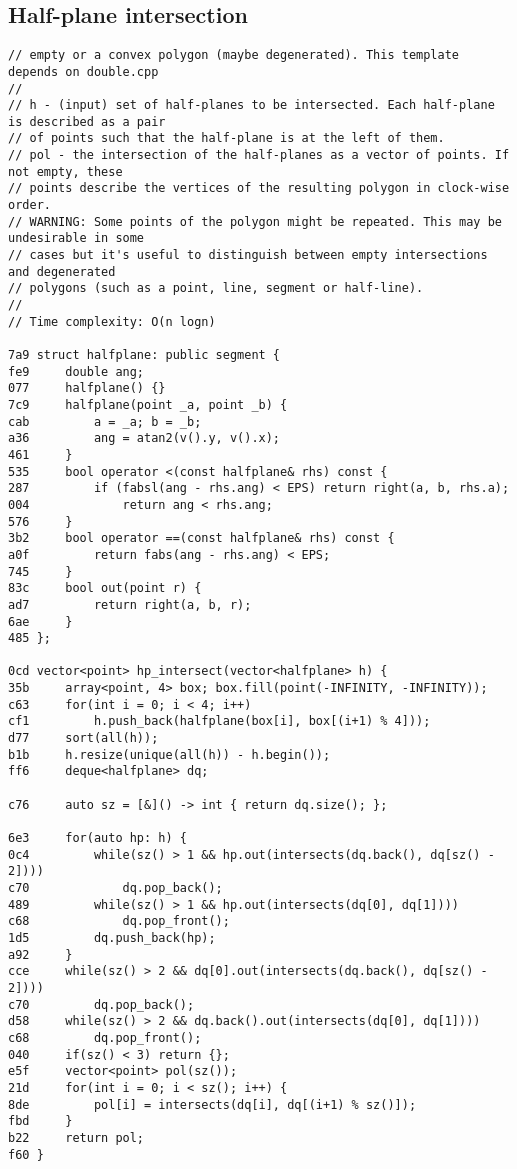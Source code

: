 \documentclass[11pt, a4paper, twoside]{article}
\begin{document}
\subsection{Half-plane intersection}
\begin{lstlisting}
// empty or a convex polygon (maybe degenerated). This template depends on double.cpp
//
// h - (input) set of half-planes to be intersected. Each half-plane is described as a pair
// of points such that the half-plane is at the left of them.
// pol - the intersection of the half-planes as a vector of points. If not empty, these
// points describe the vertices of the resulting polygon in clock-wise order.
// WARNING: Some points of the polygon might be repeated. This may be undesirable in some
// cases but it's useful to distinguish between empty intersections and degenerated
// polygons (such as a point, line, segment or half-line).
//
// Time complexity: O(n logn)

7a9 struct halfplane: public segment {
fe9 	double ang;
077 	halfplane() {}
7c9 	halfplane(point _a, point _b) {
cab 		a = _a; b = _b;
a36 		ang = atan2(v().y, v().x);
461 	}
535 	bool operator <(const halfplane& rhs) const {
287 		if (fabsl(ang - rhs.ang) < EPS) return right(a, b, rhs.a);
004 	        return ang < rhs.ang;
576 	}
3b2 	bool operator ==(const halfplane& rhs) const {
a0f 		return fabs(ang - rhs.ang) < EPS; 
745 	}
83c 	bool out(point r) {
ad7 		return right(a, b, r);
6ae 	}
485 };

0cd vector<point> hp_intersect(vector<halfplane> h) {
35b 	array<point, 4> box; box.fill(point(-INFINITY, -INFINITY));
c63 	for(int i = 0; i < 4; i++)
cf1 		h.push_back(halfplane(box[i], box[(i+1) % 4]));
d77 	sort(all(h));
b1b 	h.resize(unique(all(h)) - h.begin());
ff6 	deque<halfplane> dq;
    
c76 	auto sz = [&]() -> int { return dq.size(); };
    
6e3 	for(auto hp: h) {
0c4 		while(sz() > 1 && hp.out(intersects(dq.back(), dq[sz() - 2])))
c70 			dq.pop_back();
489 		while(sz() > 1 && hp.out(intersects(dq[0], dq[1])))
c68 			dq.pop_front();
1d5 		dq.push_back(hp);
a92 	}
cce 	while(sz() > 2 && dq[0].out(intersects(dq.back(), dq[sz() - 2])))
c70 		dq.pop_back();
d58 	while(sz() > 2 && dq.back().out(intersects(dq[0], dq[1])))
c68 		dq.pop_front();
040 	if(sz() < 3) return {};
e5f 	vector<point> pol(sz());
21d 	for(int i = 0; i < sz(); i++) {
8de 		pol[i] = intersects(dq[i], dq[(i+1) % sz()]);
fbd 	}
b22 	return pol;
f60 }
\end{lstlisting}
\end{document}
